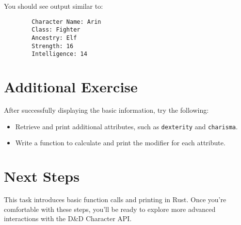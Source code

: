 \documentclass{article}
\begin{document}
	You should see output similar to:
	\begin{verbatim}
		Character Name: Arin
		Class: Fighter
		Ancestry: Elf
		Strength: 16
		Intelligence: 14
	\end{verbatim}
	
	\section*{Additional Exercise}
	After successfully displaying the basic information, try the following:
	\begin{itemize}
		\item Retrieve and print additional attributes, such as \texttt{dexterity} and \texttt{charisma}.
		\item Write a function to calculate and print the modifier for each attribute.
	\end{itemize}
	
	\section*{Next Steps}
	This task introduces basic function calls and printing in Rust. Once you’re comfortable with these steps, you’ll be ready to explore more advanced interactions with the D\&D Character API.
	
\end{document}
